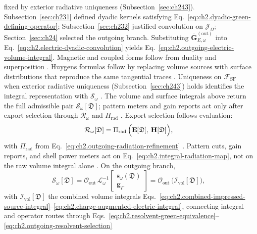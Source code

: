 fixed by exterior radiative uniqueness (Subsection~\ref{sec:ch243}).
Subsection~\ref{sec:ch231} defined dyadic kernels satisfying
Eq.~\eqref{eq:ch2.dyadic-green-defining-operator}; Subsection~\ref{sec:ch232} justified
convolution on \(\mathcal{J}_\Omega\); Section~\ref{sec:ch24} selected the outgoing
branch. Substituting \(\overline{\mathbf{G}}_{E,\omega}^{\mathrm{(out)}}\) into
Eq.~\eqref{eq:ch2.electric-dyadic-convolution} yields
Eq.~\eqref{eq:ch2.outgoing-electric-volume-integral}. Magnetic and coupled forms follow
from duality and superposition \cite{stratton1941}. Huygens formulas follow by replacing
volume sources with surface distributions that reproduce the same tangential traces
\cite{harrington2001}. Uniqueness on \(\mathcal{F}_{\mathrm{SF}}\) when exterior radiative
uniqueness (Subsection~\ref{sec:ch243}) holds identifies the integral representation
with \(\mathcal{S}_\omega\) \cite{stratton1941}.
The volume and surface integrals above return the full admissible pair $\mathcal{S}_\omega[\mathfrak{D}]$;
pattern meters and gain reports act only after export selection through $\mathcal{R}_\omega$ and
$\Pi_{\mathrm{rad}}$ \cite{stratton1941}. Export selection follows evaluation:
\begin{equation}
\label{eq:ch2.integral-radiation-map}
\mathcal{R}_\omega[\mathfrak{D}]
=
\Pi_{\mathrm{rad}}\,
\Big(\mathbf{E}[\mathfrak{D}],\,\mathbf{H}[\mathfrak{D}]\Big),
\end{equation}
with \(\Pi_{\mathrm{rad}}\) from Eq.~\eqref{eq:ch2.outgoing-radiation-refinement}
\cite{stratton1941}. Pattern cuts, gain reports, and shell power meters act on
Eq.~\eqref{eq:ch2.integral-radiation-map}, not on the raw volume integral alone
\cite{harrington2001}.
On the outgoing branch,
\begin{equation}
\label{eq:ch2.integral-resolvent-equivalence}
\mathcal{S}_\omega[\mathfrak{D}]
=
\mathcal{O}_{\mathrm{out}}\,
\mathcal{L}_\omega^{-1}\!
\begin{bmatrix}\mathbf{s}_\omega(\mathfrak{D})\\ \mathbf{g}_\Gamma\end{bmatrix}
=
\mathcal{O}_{\mathrm{out}}\,
\Big(\mathcal{I}_{\mathrm{vol}}[\mathfrak{D}]\Big),
\end{equation}
with \(\mathcal{I}_{\mathrm{vol}}[\mathfrak{D}]\) the combined volume integrals
Eqs.~\eqref{eq:ch2.combined-impressed-source-integral}--\eqref{eq:ch2.charge-augmented-electric-integral},
connecting integral and operator routes through
Eqs.~\eqref{eq:ch2.resolvent-green-equivalence}--\eqref{eq:ch2.outgoing-resolvent-selection}
